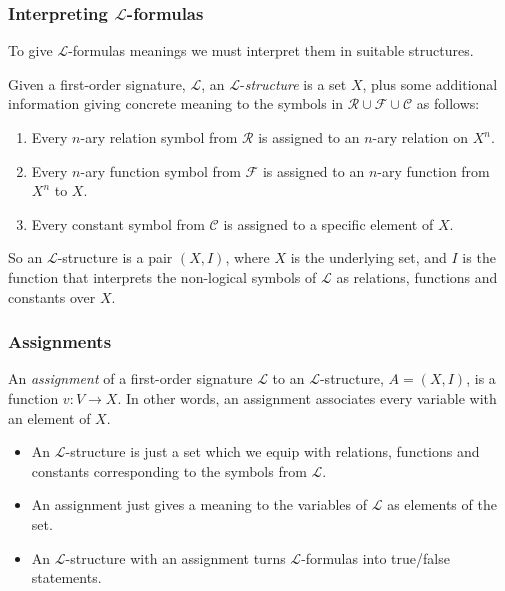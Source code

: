 \documentclass[handout]{beamer}
\newcommand{\sL}{\mathscr{L}}
\newcommand{\cR}{\mathcal{R}}
\newcommand{\cF}{\mathcal{F}}
\newcommand{\cC}{\mathcal{C}}
\begin{document}
\begin{frame}
\frametitle{Interpreting $\sL$-formulas}
To give $\sL$-formulas meanings we must interpret them in suitable structures.
\begin{definition}[$\sL$-structure]
Given a first-order signature, $\sL$, an $\sL$-\emph{structure}  is a set $X$, plus some additional information giving concrete meaning to the symbols in $\cR\cup \cF \cup \cC$ as follows: 
\begin{enumerate} 
\item Every $n$-ary relation symbol from $\cR$ is assigned to an $n$-ary relation on $X^n$. 
\item Every $n$-ary function symbol from $\cF$ is assigned to an $n$-ary function from $X^n$ to $X$.
\item Every constant symbol from $\cC$ is assigned to a specific element of $X$.
\end{enumerate} 
\end{definition}
So an $\sL$-structure is a pair $(X,I)$, where $X$ is the underlying set, and $I$ is the function that interprets the non-logical symbols of $\sL$ as relations, functions and constants over $X$.
\end{frame}

\begin{frame}
\frametitle{Assignments}
\begin{definition}[Assignment]
An \emph{assignment} of a first-order signature $\sL$ to an $\sL$-structure, $A=(X,I)$, is a function $v:V\to X$. In other words, an assignment associates every variable with an element of $X$.  
\end{definition}
\vspace{0.5cm}
\begin{itemize}
\item An $\sL$-structure is just a set which we equip with relations, functions and constants corresponding to the symbols from $\sL$.
\item An assignment just gives a meaning to the variables of $\sL$ as elements of the set.
\item An $\sL$-structure with an assignment turns $\sL$-formulas into true/false statements.
\end{itemize}
\end{frame}
\end{document}

